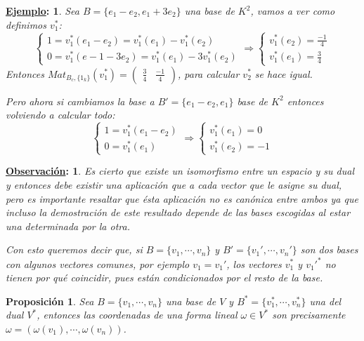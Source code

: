 \documentclass[10pt,a4paper,openright]{book}
\theoremstyle{break}
\newtheorem*{prop}{Proposición}
\newtheorem*{obs}{\underline{Observación}:}
\newtheorem*{ej}{\underline{Ejemplo}:}
\begin{document}
\begin{ej}
Sea $B=\{e_1-e_2, e_1+3e_2\}$ una base de $K^2$, vamos a ver como definimos $v_1^*$:
$$\begin{cases}1=v_1^*(e_1-e_2)=v_1^*(e_1)-v_1^*(e_2)\\ 0=v_1^*(e-1-3e_2)= v_1^*(e_1)-3v_1^*(e_2)\end{cases}\Rightarrow \begin{cases}v_1^*(e_2)=\frac{-1}{4} \\ v_1^*(e_1)=\frac{3}{4}\end{cases}$$
Entonces $Mat_{B_c, \{1_k\}}(v_1^*)=\begin{pmatrix} \frac{3}{4} & \frac{-1}{4}\end{pmatrix}$, para calcular $v_2^*$ se hace igual.

Pero ahora si cambiamos la base a $B'=\{e_1-e_2, e_1\}$ base de $K^2$ entonces volviendo a calcular todo:
$$\begin{cases}1= v_1^*(e_1-e_2) \\0=v_1^*(e_1) \end{cases}\Rightarrow \begin{cases}v_1^*(e_1)=0 \\ v_1^*(e_2)=-1\end{cases}$$
\end{ej}

\begin{obs}
Es cierto que existe un isomorfismo entre un espacio y su dual y entonces debe existir una aplicación que a cada vector que le asigne su dual, pero es importante resaltar que ésta aplicación no es canónica entre ambos ya que incluso la demostración de este resultado depende de las bases escogidas al estar una determinada por la otra.

Con esto queremos decir que, si $B=\{v_1,\cdots, v_n\}$ y $B'=\{v_1',\cdots, v_n'\}$ son dos bases con algunos vectores comunes, por ejemplo $v_1 = v_1'$, los vectores $v_1^*$ y $v_1'^*$ no tienen por qué coincidir, pues están condicionados por el resto de la base.
\end{obs}

\begin{prop}
Sea $B=\{v_1,\cdots, v_n\}$ una base de $V$ y $B^* = \{v_1^*,\cdots, v_n^*\}$ una del dual $V^*$, entonces las coordenadas de una forma lineal $\omega \in V^*$ son precisamente $\omega = (\omega(v_1), \cdots, \omega(v_n))$.
\end{prop}
\end{document}
